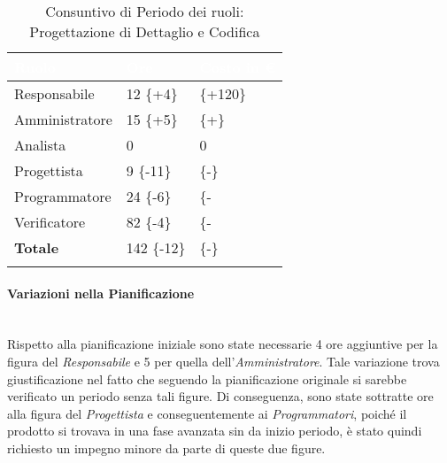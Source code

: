 \begin{longtable}{| C{.30\textwidth}| C{.15\textwidth}| C{.20\textwidth}|}
	\hline
	\textbf{\textcolor{white}{Ruolo}} & \textbf{\textcolor{white}{Ore}} & \textbf{\textcolor{white}{Costo in \euro}} \\
	\hline 
	Responsabile & 12 \{+4\} &  \{+120\} \\
	\hline
	Amministratore & 15 \{+5\} &   \{+\}\\
	\hline
	Analista & 0 & 0 \\
	\hline
	Progettista & 9 \{-11\} &   \{-\}\\
	\hline
	Programmatore & 24 \{-6\} &  \{- \\
	\hline 
	Verificatore & 82 \{-4\} &  \{-\\
	\hline
	\textbf{Totale} & 142 \{-12\} &  \{-\}\\
	\hline 
	
	\caption{Consuntivo di Periodo dei ruoli: Progettazione di Dettaglio e Codifica}
	\label{Distribuzione ruoli pdc}
\end{longtable}

\paragraph{Variazioni nella Pianificazione}\label{variazione_ra} ~\\ 
Rispetto alla pianificazione iniziale sono state necessarie 4 ore aggiuntive per la figura del \textit{Responsabile} e 5 per quella dell'\textit{Amministratore}. Tale variazione trova giustificazione nel fatto che seguendo la pianificazione originale si sarebbe verificato un periodo senza tali figure. Di conseguenza, sono state sottratte ore alla figura del \textit{Progettista} e conseguentemente ai \textit{Programmatori}, poiché il prodotto si trovava in una fase avanzata sin da inizio periodo, è stato quindi richiesto un impegno minore da parte di queste due figure.

